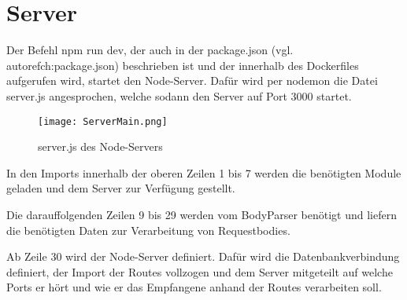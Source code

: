 
\chapter{Server}
\label{ch:Server}

Der Befehl \glqq npm run dev\grqq{}, der auch in der \glqq package.json\grqq{} (vgl. autoref{ch:package.json}) beschrieben ist und der innerhalb des Dockerfiles aufgerufen wird, startet den Node-Server. Dafür wird per \glqq nodemon\grqq{} die Datei \glqq server.js\grqq{} angesprochen, welche sodann den Server auf Port 3000 startet.

\begin{figure}[h]
\centering
\texttt{[image: ServerMain.png]}
\vspace{1pt}
\caption{server.js des Node-Servers}
\label{fig:server.js des Node-Servers}
\end{figure}


In den Imports innerhalb der oberen Zeilen 1 bis 7 werden die benötigten Module geladen und dem Server zur Verfügung gestellt.

Die darauffolgenden Zeilen 9 bis 29 werden vom \glqq BodyParser\grqq{} benötigt und liefern die benötigten Daten zur Verarbeitung von Requestbodies.

Ab Zeile 30 wird der Node-Server definiert. Dafür wird die Datenbankverbindung definiert, der Import der Routes vollzogen und dem Server mitgeteilt auf welche Ports er hört und wie er das Empfangene anhand der Routes verarbeiten soll.
